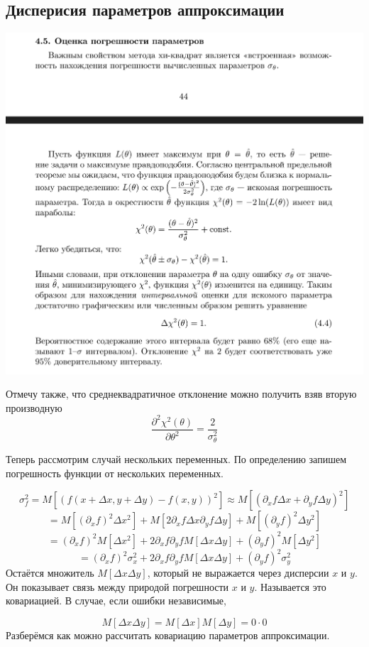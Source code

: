\documentclass[a4paper,12pt]{article}
\renewcommand{\d}[2][ ]{%
\partial^{#1}_{#2}}
\begin{document}
\subsection{Дисперисия параметров аппроксимации}
\includegraphics[width=0.8\paperwidth, center]{погрешность_параметров.png}

Отмечу также, что среднеквадратичное отклонение можно получить взяв вторую производную
\[ \frac{\partial^2 \chi^2(\theta)}{\partial \theta^2} = \frac{2}{\sigma_\theta^2}\]

Теперь рассмотрим случай нескольких переменных. По определению запишем
погрешность функции от нескольких переменных.

\[ \sigma_f^2 = M[\left(f(x+\Delta x, y + \Delta y) - f(x, y)\right)^2] 
\approx M[(\d{x}f\Delta x + \d{y}f\Delta y)^2]\]
\[ = M[(\d{x}f)^2\Delta x^2] + M[2\d{x}f\Delta x \d{y}f\Delta y] + M[(\d{y}f)^2\Delta y^2] \]
\[ = (\d{x}f)^2M[\Delta x^2] + 2\d{x}f \d{y}f M[\Delta x \Delta y] + (\d{y}f)^2 M[\Delta y^2] \]
\[ = (\d{x}f)^2\sigma_x^2 + 2\d{x}f \d{y}f M[\Delta x \Delta y] + (\d{y}f)^2 \sigma_y^2 \]
Остаётся множитель $M[\Delta x \Delta y]$, который не выражается через дисперсии $x$ и $y$. 
Он показывает связь между природой погрешности $x$ и $y$. Называется это ковариацией. В случае, если ошибки независимые,

\[ M[\Delta x \Delta y] = M[\Delta x] M[\Delta y] = 0\cdot0\]
Разберёмся как можно рассчитать ковариацию параметров аппроксимации.
\end{document}
